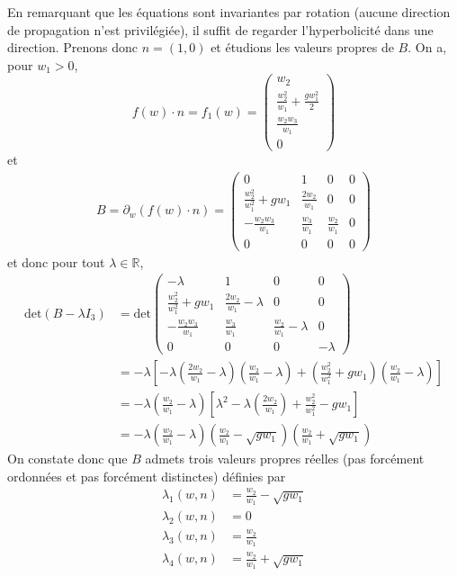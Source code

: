 \documentclass[
	french,
	11pt, %
]{fphw}
\newcommand{\mymat}[9]{\begin{pmatrix} #1 & #2 & #3 \\ #4 & #5 & #6 \\ #7 & #8 &#9 \end{pmatrix}}  %
\renewcommand{\vector}[4]{\begin{pmatrix} #1  \\ #2 \\ #3 \\ #4 \end{pmatrix}}   %
\begin{document}
\noindent En remarquant que les équations sont invariantes par rotation (aucune direction de propagation n'est privilégiée), il suffit de regarder l'hyperbolicité dans une direction. Prenons donc $n=(1,0)$ et étudions les valeurs propres de $B$. On a, pour $w_1 > 0$,
$$f(w)\cdot n = f_1(w) = \vector{w_2}{\frac{w_2^2}{w_1} + \frac{gw_1^2}{2}}{\frac{w_2w_3}{w_1}}{0}$$
et 
\begin{align*}
	B = \partial_w \left( f(w)\cdot n \right) = \begin{pmatrix} 0 & 1 & 0 & 0 \\ \frac{w_2^2}{w_1^2}+gw_1 & \frac{2w_2}{w_1} & 0 & 0 \\ -\frac{w_2w_3}{w_1} & \frac{w_3}{w_1} & \frac{w_2}{w_1} & 0 \\ 0 & 0 & 0 & 0 \end{pmatrix}
\end{align*}
et donc pour tout $\lambda \in \mathbb{R} $,
\begin{align*}
	\text{det}(B-\lambda I_3) &= \text{det} \begin{pmatrix} -\lambda & 1 & 0 & 0 \\ \frac{w_2^2}{w_1^2}+gw_1 & \frac{2w_2}{w_1}-\lambda & 0 & 0 \\ -\frac{w_2w_3}{w_1} & \frac{w_3}{w_1} & \frac{w_2}{w_1}-\lambda & 0 \\ 0 & 0 & 0 & -\lambda \end{pmatrix}  \\
	&= -\lambda \left[ -\lambda \left( \frac{2w_2}{w_1} -\lambda \right)\left( \frac{w_2}{w_1} -\lambda \right) + \left( \frac{w_2^2}{w_1^2} +gw_1 \right)\left( \frac{w_2}{w_1} -\lambda \right) \right]    \\
	&= -\lambda \left( \frac{w_2}{w_1} -\lambda \right) \left[ \lambda^2 - \lambda \left(\frac{2w_2}{w_1}\right) + \frac{w_2^2}{w_1^2}-gw_1  \right] \\
	&= -\lambda \left( \frac{w_2}{w_1} -\lambda \right) \left( \frac{w_2}{w_1} - \sqrt{gw_1} \right) \left( \frac{w_2}{w_1} + \sqrt{gw_1} \right)
\end{align*}
On constate donc que $B$ admets trois valeurs propres réelles (pas forcément ordonnées et pas forcément distinctes) définies par 
\begin{align*}
	\lambda_1(w,n) &= \frac{w_2}{w_1} - \sqrt{gw_1 } \\
	\lambda_2(w,n) &= 0 \\
	\lambda_3(w,n) &= \frac{w_2}{w_1} \\
	\lambda_4(w,n) &= \frac{w_2}{w_1} + \sqrt{gw_1}
\end{align*}
\end{document}

